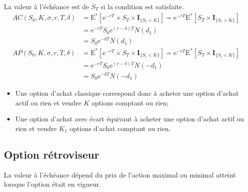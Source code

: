 \documentclass[10pt, french]{article}
\begin{document}
\begin{multicols*}{2}
\begin{definitionNOHFILLsub}
La valeur à l'échéance est de $S_{T}$ si la condition est satisfaite.\\

\begin{align*}
	AC(S_{0}, K, \sigma, r, T, \delta)
	&=	\text{E}^{*}[\textrm{e}^{-rT} \times S_{T}	\times	\bm{I}_{\{S_{t}	>	K\}}]	
	=	\textrm{e}^{-rT} \text{E}^{*}[S_{T}	\times	\bm{I}_{\{S_{t}	>	K\}}]	\\
	&=	\textrm{e}^{-rT} S_{0} \textrm{e}^{(r	-	\delta)T}N(d_{1})	\\
	&=	S_{0} \textrm{e}^{-\delta T}N(d_{1})	\\
	AP(S_{0}, K, \sigma, r, T, \delta)
	&=	\text{E}^{*}[\textrm{e}^{-rT} \times S_{T}	\times	\bm{I}_{\{S_{t}	<	K\}}]	
	=	\textrm{e}^{-rT} \text{E}^{*}[S_{T}	\times	\bm{I}_{\{S_{t}	<	K\}}]	\\
	&=	\textrm{e}^{-rT} S_{0} \textrm{e}^{(r	-	\delta)T}N(-d_{1})	\\
	&=	S_{0} \textrm{e}^{-\delta T}N(-d_{1})	
\end{align*}
\end{definitionNOHFILLsub}

\begin{itemize}
	\item	Une option d'achat classique correspond donc à acheter une option d'achat actif ou rien et vendre $K$ options comptant ou rien;
	\item	Une option d'achat avec écart équivaut à acheter une option d'achat actif ou rien et vendre $K_{1}$ options d'achat comptant ou rien.
\end{itemize}

\columnbreak
\subsection{Option rétroviseur}
\begin{definitionNOHFILL}
La valeur à l'échéance dépend du prix de l'action maximal ou minimal atteint lorsque l'option était en vigueur.\\


\end{definitionNOHFILL}
\end{multicols*}
\end{document}
